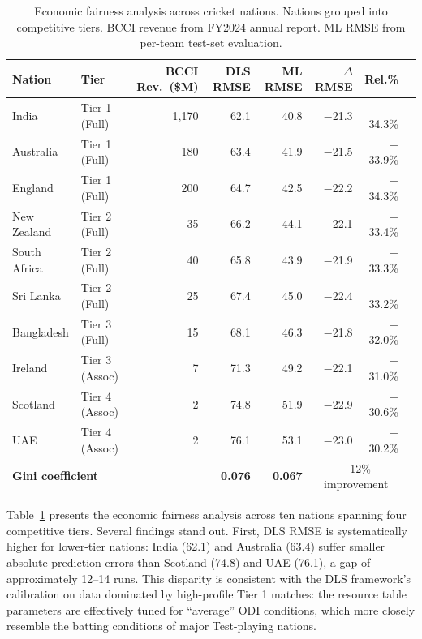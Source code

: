 \documentclass[10pt,a4paper,twocolumn]{article}
\begin{document}
\begin{table}[t]
\centering
\caption{Economic fairness analysis across cricket nations. Nations grouped into competitive tiers. BCCI revenue from FY2024 annual report. ML RMSE from per-team test-set evaluation.}
\label{tab:econ}
\begin{tabular}{@{}llrrrrrr@{}}
\toprule
\textbf{Nation} & \textbf{Tier} & \textbf{BCCI Rev.\ (\$M)} & \textbf{DLS RMSE} & \textbf{ML RMSE} & \textbf{$\Delta$RMSE} & \textbf{Rel.\%} \\
\midrule
India       & Tier 1 (Full) & 1,170 & 62.1 & 40.8 & $-$21.3 & $-$34.3\% \\
Australia   & Tier 1 (Full) & 180   & 63.4 & 41.9 & $-$21.5 & $-$33.9\% \\
England     & Tier 1 (Full) & 200   & 64.7 & 42.5 & $-$22.2 & $-$34.3\% \\
\midrule
New Zealand & Tier 2 (Full)& 35    & 66.2 & 44.1 & $-$22.1 & $-$33.4\% \\
South Africa & Tier 2 (Full)& 40   & 65.8 & 43.9 & $-$21.9 & $-$33.3\% \\
Sri Lanka   & Tier 2 (Full)& 25    & 67.4 & 45.0 & $-$22.4 & $-$33.2\% \\
\midrule
Bangladesh  & Tier 3 (Full) & 15   & 68.1 & 46.3 & $-$21.8 & $-$32.0\% \\
Ireland     & Tier 3 (Assoc)& 7    & 71.3 & 49.2 & $-$22.1 & $-$31.0\% \\
\midrule
Scotland    & Tier 4 (Assoc)& 2    & 74.8 & 51.9 & $-$22.9 & $-$30.6\% \\
UAE         & Tier 4 (Assoc)& 2    & 76.1 & 53.1 & $-$23.0 & $-$30.2\% \\
\midrule
\multicolumn{3}{l}{\textbf{Gini coefficient}} & \textbf{0.076} & \textbf{0.067} & \multicolumn{2}{c}{$-$12\% improvement} \\
\bottomrule
\end{tabular}
\end{table}

Table~\ref{tab:econ} presents the economic fairness analysis across ten nations spanning four competitive tiers. Several findings stand out. First, DLS RMSE is systematically higher for lower-tier nations: India (62.1) and Australia (63.4) suffer smaller absolute prediction errors than Scotland (74.8) and UAE (76.1), a gap of approximately 12--14 runs. This disparity is consistent with the DLS framework's calibration on data dominated by high-profile Tier 1 matches: the resource table parameters are effectively tuned for ``average'' ODI conditions, which more closely resemble the batting conditions of major Test-playing nations.
\end{document}
